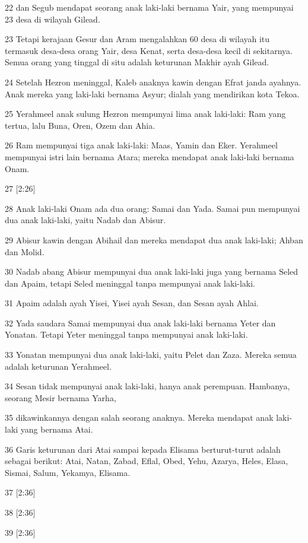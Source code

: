\par 22 dan Segub mendapat seorang anak laki-laki bernama Yair, yang mempunyai 23 desa di wilayah Gilead.
\par 23 Tetapi kerajaan Gesur dan Aram mengalahkan 60 desa di wilayah itu termasuk desa-desa orang Yair, desa Kenat, serta desa-desa kecil di sekitarnya. Semua orang yang tinggal di situ adalah keturunan Makhir ayah Gilead.
\par 24 Setelah Hezron meninggal, Kaleb anaknya kawin dengan Efrat janda ayahnya. Anak mereka yang laki-laki bernama Asyur; dialah yang mendirikan kota Tekoa.
\par 25 Yerahmeel anak sulung Hezron mempunyai lima anak laki-laki: Ram yang tertua, lalu Buna, Oren, Ozem dan Ahia.
\par 26 Ram mempunyai tiga anak laki-laki: Maas, Yamin dan Eker. Yerahmeel mempunyai istri lain bernama Atara; mereka mendapat anak laki-laki bernama Onam.
\par 27 [2:26]
\par 28 Anak laki-laki Onam ada dua orang: Samai dan Yada. Samai pun mempunyai dua anak laki-laki, yaitu Nadab dan Abisur.
\par 29 Abisur kawin dengan Abihail dan mereka mendapat dua anak laki-laki; Ahban dan Molid.
\par 30 Nadab abang Abisur mempunyai dua anak laki-laki juga yang bernama Seled dan Apaim, tetapi Seled meninggal tanpa mempunyai anak laki-laki.
\par 31 Apaim adalah ayah Yisei, Yisei ayah Sesan, dan Sesan ayah Ahlai.
\par 32 Yada saudara Samai mempunyai dua anak laki-laki bernama Yeter dan Yonatan. Tetapi Yeter meninggal tanpa mempunyai anak laki-laki.
\par 33 Yonatan mempunyai dua anak laki-laki, yaitu Pelet dan Zaza. Mereka semua adalah keturunan Yerahmeel.
\par 34 Sesan tidak mempunyai anak laki-laki, hanya anak perempuan. Hambanya, seorang Mesir bernama Yarha,
\par 35 dikawinkannya dengan salah seorang anaknya. Mereka mendapat anak laki-laki yang bernama Atai.
\par 36 Garis keturunan dari Atai sampai kepada Elisama berturut-turut adalah sebagai berikut: Atai, Natan, Zabad, Eflal, Obed, Yehu, Azarya, Heles, Elasa, Sismai, Salum, Yekamya, Elisama.
\par 37 [2:36]
\par 38 [2:36]
\par 39 [2:36]
